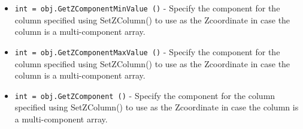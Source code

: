 \begin{itemize}
\item  \verb|int = obj.GetZComponentMinValue ()| -  Specify the component for the column specified using SetZColumn() to
 use as the Zcoordinate in case the column is a multi-component array.

\item  \verb|int = obj.GetZComponentMaxValue ()| -  Specify the component for the column specified using SetZColumn() to
 use as the Zcoordinate in case the column is a multi-component array.

\item  \verb|int = obj.GetZComponent ()| -  Specify the component for the column specified using SetZColumn() to
 use as the Zcoordinate in case the column is a multi-component array.

\end{itemize}
